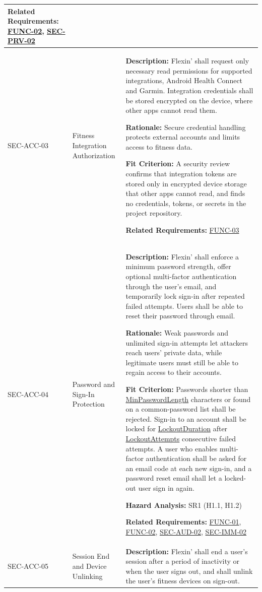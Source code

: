\documentclass[12pt]{article}
\newcommand{\const}[1]{\hyperlink{const:#1}{\textsf{#1}}}
\begin{document}
\begin{xltabular}{\textwidth}{|p{2.6cm}|p{3.4cm}|X|}
\textbf{Related Requirements:} \hyperlink{req:FUNC-02}{FUNC-02}, \hyperlink{req:SEC-PRV-02}{SEC-PRV-02}\\
\hline

SEC-ACC-03\hypertarget{req:SEC-ACC-03}{} &
Fitness Integration Authorization &
\textbf{Description:} Flexin' shall request only necessary read permissions for supported integrations, Android Health Connect and Garmin. Integration credentials shall be stored encrypted on the device, where other apps cannot read them.

\textbf{Rationale:} Secure credential handling protects external accounts and limits access to fitness data.

\textbf{Fit Criterion:} A security review confirms that integration tokens are stored only in encrypted device storage that other apps cannot read, and finds no credentials, tokens, or secrets in the project repository. 

\textbf{Related Requirements:} \hyperlink{req:FUNC-03}{FUNC-03}\\
\hline

SEC-ACC-04\hypertarget{req:SEC-ACC-04}{} &
Password and Sign-In Protection &
\textbf{Description:} Flexin' shall enforce a minimum password strength, offer optional multi-factor authentication through the user's email, and temporarily lock sign-in after repeated failed attempts. Users shall be able to reset their password through email.

\textbf{Rationale:} Weak passwords and unlimited sign-in attempts let attackers reach users' private data, while legitimate users must still be able to regain access to their accounts.

\textbf{Fit Criterion:} Passwords shorter than \const{MinPasswordLength} characters or found on a common-password list shall be rejected. Sign-in to an account shall be locked for \const{LockoutDuration} after \const{LockoutAttempts} consecutive failed attempts. A user who enables multi-factor authentication shall be asked for an email code at each new sign-in, and a password reset email shall let a locked-out user sign in again.

\textbf{Hazard Analysis:} SR1 (H1.1, H1.2) 

\textbf{Related Requirements:} \hyperlink{req:FUNC-01}{FUNC-01}, \hyperlink{req:FUNC-02}{FUNC-02}, \hyperlink{req:SEC-AUD-02}{SEC-AUD-02}, \hyperlink{req:SEC-IMM-02}{SEC-IMM-02}\\
\hline

SEC-ACC-05\hypertarget{req:SEC-ACC-05}{} &
Session End and Device Unlinking &
\textbf{Description:} Flexin' shall end a user's session after a period of inactivity or when the user signs out, and shall unlink the user's fitness devices on sign-out.


\end{xltabular}
\end{document}
